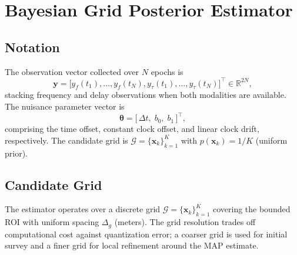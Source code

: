 \section{Bayesian Grid Posterior Estimator}\label{sec:estimator}

\subsection{Notation}
The observation vector collected over $N$ epochs is
\begin{equation}
  \mathbf{y}
  = \bigl[
      y_f(t_1), \ldots, y_f(t_N),
      y_\tau(t_1), \ldots, y_\tau(t_N)
    \bigr]^{\top}
  \in \mathbb{R}^{2N},
  \label{eq:obs_vector}
\end{equation}
stacking frequency and delay observations when both modalities are available.
The nuisance parameter vector is
\begin{equation}
  \boldsymbol{\theta} = \bigl[\, \Delta t,\; b_0,\; b_1 \,\bigr]^{\top},
  \label{eq:nuisance_vec}
\end{equation}
comprising the time offset, constant clock offset, and linear clock drift,
respectively.  The candidate grid is $\mathcal{G} = \{\mathbf{x}_k\}_{k=1}^{K}$
with $p(\mathbf{x}_k) = 1/K$ (uniform prior).

\subsection{Candidate Grid}
The estimator operates over a discrete grid $\mathcal{G} = \{\mathbf{x}_k\}_{k=1}^{K}$
covering the bounded ROI with uniform spacing $\Delta_g$ (meters).  The grid
resolution trades off computational cost against quantization error; a coarser
grid is used for initial survey and a finer grid for local refinement around the
MAP estimate.

